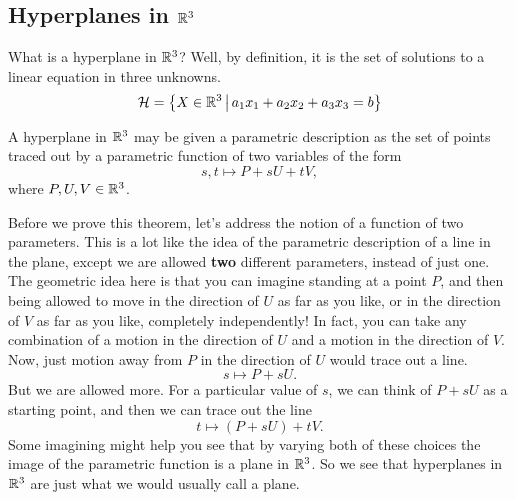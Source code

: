 \documentclass[elementsmain.tex]{subfiles}
\begin{document}
\subsection*{Hyperplanes in $\mathbb{R}^3$}

What is a hyperplane in $\mathbb{R}^3$? Well, by definition, it is the set of solutions to a linear equation in three unknowns.
\[
\mathcal{H} = \left\{ X \in \mathbb{R}^3 \,\middle|\, a_1 x_1 + a_2 x_2 + a_3x_3= b \right\}
\]



\begin{theorem} A hyperplane in $\mathbb{R}^3$ may be given a 
parametric description as the set of points 
traced out by a parametric function of two variables of the form
\[
s,t \mapsto P + s U + t V,
\]
where $P, U, V \in \mathbb{R}^3$.
\end{theorem}

Before we prove this theorem, let's address the notion of a function of two parameters. This is a lot like the idea of the parametric description of a line in the plane, except we are allowed \textbf{two} different parameters, instead of just one. The geometric idea here is that you can imagine standing at a point $P$, and then being allowed to move in the direction of $U$ as far as you like, or in the direction of $V$ as far as you like, completely independently! In fact, you can take any combination of a motion in the direction of $U$ and a motion in the direction of $V$. Now, just motion away from $P$ in the direction of $U$ would trace out a line. 
\[
s \mapsto P + sU.
\]
But we are allowed more. For a particular value of $s$, we can think of $P+sU$ as a starting point, and then we can trace out the line
\[
t \mapsto (P+sU) + t V.
\] 
Some imagining might help you see that by varying both of these choices the image of the parametric function is a plane in $\mathbb{R}^3$. So we see that hyperplanes in $\mathbb{R}^3$ are just what we would usually call a plane.
\end{document}
